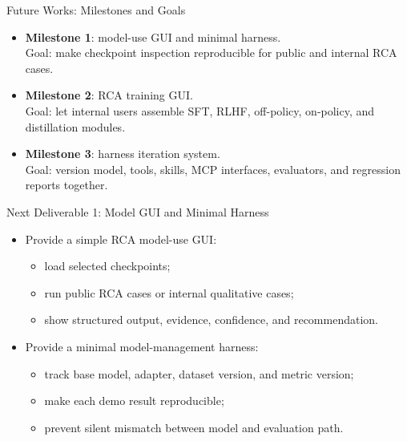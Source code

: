 \begin{frame}{Future Works: Milestones and Goals}
  \begin{itemize}
    \item \textbf{Milestone 1}: model-use GUI and minimal harness.\\
      Goal: make checkpoint inspection reproducible for public and internal RCA
      cases.
    \item \textbf{Milestone 2}: RCA training GUI.\\
      Goal: let internal users assemble SFT, RLHF, off-policy, on-policy, and
      distillation modules.
    \item \textbf{Milestone 3}: harness iteration system.\\
      Goal: version model, tools, skills, MCP interfaces, evaluators, and
      regression reports together.
  \end{itemize}
\end{frame}

\begin{frame}{Next Deliverable 1: Model GUI and Minimal Harness}
  \begin{itemize}
    \item Provide a simple RCA model-use GUI:
      \begin{itemize}
        \item load selected checkpoints;
        \item run public RCA cases or internal qualitative cases;
        \item show structured output, evidence, confidence, and recommendation.
      \end{itemize}
    \item Provide a minimal model-management harness:
      \begin{itemize}
        \item track base model, adapter, dataset version, and metric version;
        \item make each demo result reproducible;
        \item prevent silent mismatch between model and evaluation path.
      \end{itemize}
  \end{itemize}
\end{frame}

